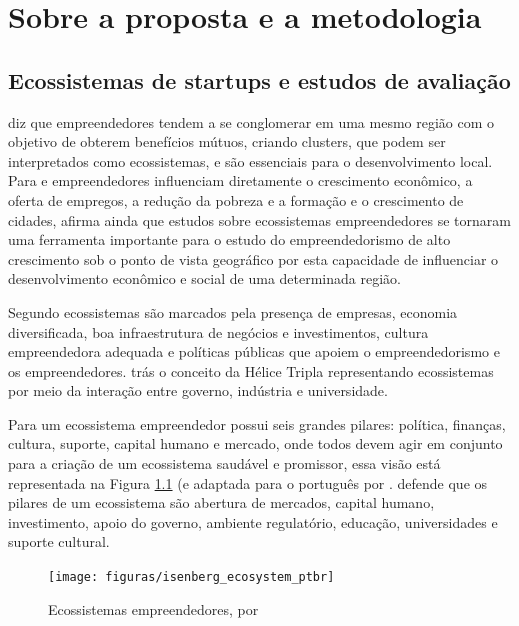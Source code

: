 \chapter[Sobre a proposta e a metodologia]{Sobre a proposta e a metodologia}
\label{cap-sobre-a-proposta-e-a-metodologia}

\section{Ecossistemas de startups e estudos de avaliação}
\label{section:um_breve_apanhado_sobre_ecossistemas_de_startups_e_estudos_de_avaliação}

 diz que empreendedores tendem a se conglomerar em uma mesmo região com o objetivo de obterem benefícios mútuos, criando clusters, que podem ser interpretados como ecossistemas, e são essenciais para o desenvolvimento local. Para  e  empreendedores influenciam diretamente o crescimento econômico, a oferta de empregos, a redução da pobreza e a formação e o crescimento de cidades,  afirma ainda que estudos sobre ecossistemas empreendedores se tornaram uma ferramenta importante para o estudo do empreendedorismo de alto crescimento sob o ponto de vista geográfico por esta capacidade de influenciar o desenvolvimento econômico e social de uma determinada região.

Segundo  ecossistemas são marcados pela presença de empresas, economia diversificada, boa infraestrutura de negócios e investimentos, cultura empreendedora adequada e políticas públicas que apoiem o empreendedorismo e os empreendedores.  trás o conceito da Hélice Tripla representando ecossistemas por meio da interação entre governo, indústria e universidade.

Para  um ecossistema empreendedor possui seis grandes pilares: política, finanças, cultura, suporte, capital humano e mercado, onde todos devem agir em conjunto para a criação de um ecossistema saudável e promissor, essa visão está representada na Figura \ref{figure:isenberg_ecosystem} (e adaptada para o português por .  defende que os pilares de um ecossistema são abertura de mercados, capital humano, investimento, apoio do governo, ambiente regulatório, educação, universidades e suporte cultural.

\begin{figure}[!htb]
\centering
\texttt{[image: figuras/isenberg\_ecosystem\_ptbr]}
\caption{Ecossistemas empreendedores, por }
\label{figure:isenberg_ecosystem}
\end{figure}

